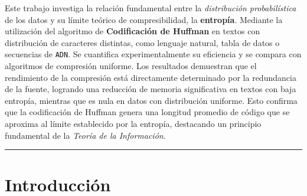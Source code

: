 \documentclass[a4paper, 10pt]{article}
\begin{document}
Este trabajo investiga la relación fundamental entre la \textit{distribución probabilística} de los datos y su límite teórico de compresibilidad, la \textbf{entropía}. Mediante la utilización del algoritmo de \textbf{Codificación de Huffman} en textos con distribución de caracteres distintas, como lenguaje natural, tabla de datos o secuencias de \texttt{ADN}. Se cuantifica experimentalmente su eficiencia y se compara con algoritmos de compresión uniforme. Los resultados demuestran que el rendimiento de la compresión está directamente determinado por la redundancia de la fuente, logrando una reducción de memoria significativa en textos con baja entropía, mientras que es nula en datos con distribución uniforme. Esto confirma que la codificación de Huffman genera una longitud promedio de código que se aproxima al límite establecido por la entropía, destacando un principio fundamental de la \textit{Teoría de la Información}.

\vspace{10pt}

\noindent\hrule


\section{Introducción}
\end{document}
